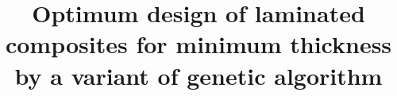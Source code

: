 \documentclass[10pt]{article}
\title{Optimum design of laminated composites for minimum thickness by a variant
of genetic algorithm}
\begin{document}
\begin{titlepage}
	\maketitle
\end{titlepage}

\begin{titlepage}
	\begin{abstract}
		
	\end{abstract}
\end{titlepage}














\end{document}
